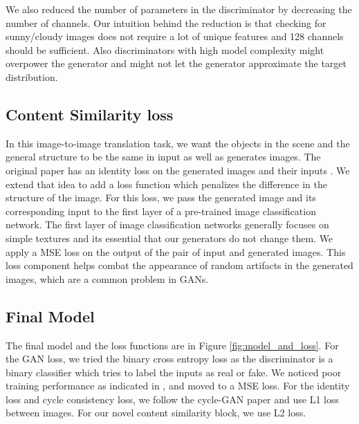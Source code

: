 \documentclass[10pt,twocolumn,letterpaper]{article}
\begin{document}
We also reduced the number of parameters in the discriminator by decreasing the number of channels. Our intuition behind the reduction is that checking for sunny/cloudy images does not require a lot of unique features and 128 channels should be sufficient. Also discriminators with high model complexity might overpower the generator and might not let the generator approximate the target distribution.

\subsection{Content Similarity loss}
In this image-to-image translation task, we want the objects in the scene and the general structure to be the same in input as well as generates images. The original paper has an identity loss on the generated images and their inputs \cite{zhu2017unpaired}. We extend that idea to add a loss function which penalizes the difference in the structure of the image. For this loss, we pass the generated image and its corresponding input to the first layer of a pre-trained image classification network. The first layer of image classification networks generally focuses on simple textures and its essential that our generators do not change them. We apply a MSE loss on the output of the pair of input and generated images. This loss component helps combat the appearance of random artifacts in the generated images, which are a common problem in GANs.

\subsection{Final Model}

The final model and the loss functions are in Figure \ref{fig:model_and_loss}. For the GAN loss, we tried the binary cross entropy loss as the discriminator is a binary classifier which tries to label the inputs as real or fake. We noticed poor training performance as indicated in \cite{zhu2017unpaired}, \cite{mao2017least} and moved to a MSE loss. For the identity loss and cycle consistency loss, we follow the cycle-GAN paper and use L1 loss between images. For our novel content similarity block, we use L2 loss.
\end{document}
